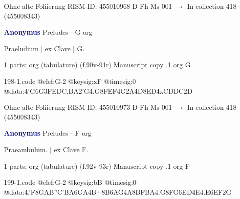 \documentclass[twocolumn]{book}
\begin{document}
\newline Ohne alte Foliierung
\newline RISM-ID: 455010968
\newline D-Fh  Ms 001
\newline $\rightarrow$ In collection 418 (455008343)
      
\newline \par \vspace{7pt} \textcolor{darkblue}{\textbf{Anonymus  }}
\newline Preludes - G
\newline org
\newline \begin{itshape}[f.90v, at left:] Praeludium | ex Clave | G.\end{itshape} 
\newline \textcolor{darkblue}{}  1 parts: org (tabulature)  (f.90v-91r)
\newline Manuscript copy
.1  org  G  
\begin{filecontents*}{198-1.code}
@clef:G-2
@keysig:xF
@timesig:0
@data:4'G{6G3FE}{DC,BA}2'G4.G8F{EF}4G2A4D{8ED}4xCDDC2D
\end{filecontents*}
\newline
%

\newline Ohne alte Foliierung
\newline RISM-ID: 455010973
\newline D-Fh  Ms 001
\newline $\rightarrow$ In collection 418 (455008343)
      
\newline \par \vspace{7pt} \textcolor{darkblue}{\textbf{Anonymus  }}
\newline Preludes - F
\newline org
\newline \begin{itshape}[f.92v, at left:] Praeambulum. | ex Clave F.\end{itshape} 
\newline \textcolor{darkblue}{}  1 parts: org (tabulature)  (f.92v-93r)
\newline Manuscript copy
.1  org  F  
\begin{filecontents*}{199-1.code}
@clef:G-2
@keysig:bB
@timesig:0
@data:4.'F8G{AB''C'B}{A6GA}4B+{8B6AG}4A{8BFBA}4.G8F{G6ED}4E4.E{6EF}2G
\end{filecontents*}
\newline
%
\end{document}
